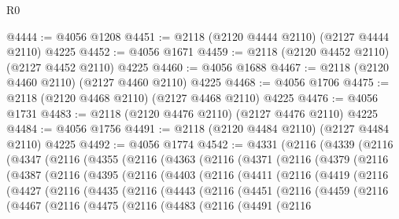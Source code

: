 \begin{lexlean}{R0}
\begin{coremodule}
@4444 := @4056 @1208
@4451 := @2118 (@2120 @4444 @2110) (@2127 @4444 @2110) @4225
@4452 := @4056 @1671
@4459 := @2118 (@2120 @4452 @2110) (@2127 @4452 @2110) @4225
@4460 := @4056 @1688
@4467 := @2118 (@2120 @4460 @2110) (@2127 @4460 @2110) @4225
@4468 := @4056 @1706
@4475 := @2118 (@2120 @4468 @2110) (@2127 @4468 @2110) @4225
@4476 := @4056 @1731
@4483 := @2118 (@2120 @4476 @2110) (@2127 @4476 @2110) @4225
@4484 := @4056 @1756
@4491 := @2118 (@2120 @4484 @2110) (@2127 @4484 @2110) @4225
@4492 := @4056 @1774
@4542 := @4331
    (@2116
      (@4339
        (@2116
          (@4347
            (@2116
              (@4355
                (@2116
                  (@4363
                    (@2116
                      (@4371
                        (@2116
                          (@4379
                            (@2116
                              (@4387
                                (@2116
                                  (@4395
                                    (@2116
                                      (@4403
                                        (@2116
                                          (@4411
                                            (@2116
                                              (@4419
                                                (@2116
                                                  (@4427
                                                    (@2116
                                                      (@4435
                                                        (@2116
                                                          (@4443
                                                            (@2116
                                                              (@4451
                                                                (@2116
                                                                  (@4459
                                                                    (@2116
                                                                      (@4467
                                                                        (@2116
                                                                          (@4475
                                                                            (@2116
                                                                              (@4483
                                                                                (@2116
                                                                                  (@4491
                                                                                    (@2116

\end{coremodule}
\end{lexlean}
